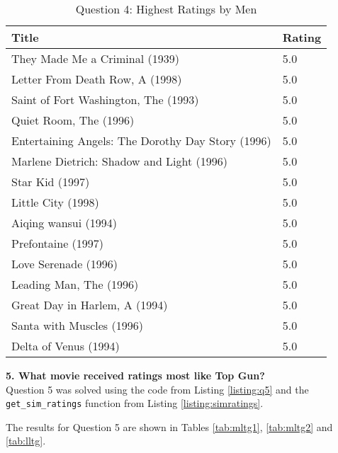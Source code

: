 \begin{table}[h!]
\centering
\begin{tabular}{| l | l |}
\hline
Title & Rating \\
\hline
They Made Me a Criminal (1939) & 5.0 \\
Letter From Death Row, A (1998) & 5.0 \\
Saint of Fort Washington, The (1993) & 5.0 \\
Quiet Room, The (1996) & 5.0 \\
Entertaining Angels: The Dorothy Day Story (1996) & 5.0 \\
Marlene Dietrich: Shadow and Light (1996)  & 5.0 \\
Star Kid (1997) & 5.0 \\
Little City (1998) & 5.0 \\
Aiqing wansui (1994) & 5.0 \\
Prefontaine (1997) & 5.0 \\
Love Serenade (1996) & 5.0 \\
Leading Man, The (1996) & 5.0 \\
Great Day in Harlem, A (1994) & 5.0 \\
Santa with Muscles (1996) & 5.0 \\
Delta of Venus (1994) & 5.0 \\
\hline
\end{tabular}
\caption{Question 4: Highest Ratings by Men}
\label{tab:hmratings}
\end{table}

\textbf{5. What movie received ratings most like Top Gun?}\\

Question 5 was solved using the code from Listing \ref{listing:q5} and the {\tt get\_sim\_ratings} function from Listing \ref{listing:simratings}.





The results for Question 5 are shown in Tables \ref{tab:mltg1}, \ref{tab:mltg2} and \ref{tab:lltg}.

